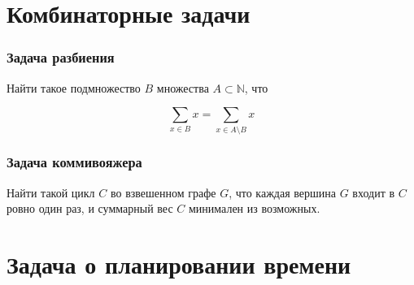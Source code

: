 \documentclass[24pt,pdf,hyperref={unicode},aspectratio=169]{beamer}
\newcommand{\seg}[4]{
\draw[draw=#4] (#1,#3) -- (#2,#3);
\draw[draw=#4] ($(#1,#3)-(0,0.1)$) -- ($(#1,#3)+(0,0.1)$);
\draw[draw=#4] ($(#2,#3)-(0,0.1)$) -- ($(#2,#3)+(0,0.1)$);
}
\newcommand{\segb}[3]{\seg{#1}{#2}{#3}{black}}
\begin{document}
\section{Комбинаторные задачи}


\begin{frame}\frametitle{Задача разбиения}

Найти такое подмножество $B$ множества $A\subset \mathbb{N}$, что 

$$
\sum_{x\in B} x = \sum_{x\in A\setminus B} x
$$

\end{frame}

\begin{frame}\frametitle{Задача коммивояжера}


Найти такой цикл $C$ во взвешенном графе $G$, что каждая вершина $G$ входит в $C$ ровно один раз, и суммарный вес $C$ минимален из возможных.
\end{frame}


\section{Задача о планировании времени}

\begin{frame}
\begin{center}
\end{center}
\end{frame}

\begin{frame}
\begin{center}
\end{center}
\end{frame}

\begin{frame}
\begin{center}
\end{center}
\end{frame}
\end{document}
